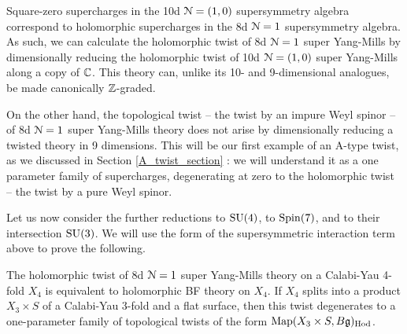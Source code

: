 \documentclass[10pt, oneside]{article}
\begin{document}
Square-zero supercharges in the 10d $\mathcal{N}=(1,0)$ supersymmetry algebra correspond to holomorphic supercharges in the 8d $\mathcal{N}=1$ supersymmetry algebra.  As such, we can calculate the holomorphic twist of 8d $\mathcal{N}=1$ super Yang-Mills by dimensionally reducing the holomorphic twist of 10d $\mathcal{N}=(1,0)$ super Yang-Mills along a copy of $\mathbb C$.  This theory can, unlike its 10- and 9-dimensional analogues, be made canonically $\mathbb Z$-graded.

On the other hand, the topological twist -- the twist by an impure Weyl spinor -- of 8d $\mathcal{N}=1$ super Yang-Mills theory does not arise by dimensionally reducing a twisted theory in 9 dimensions.  This will be our first example of an A-type twist, as we discussed in Section \ref{A_twist_section} : we will understand it as a one parameter family of supercharges, degenerating at zero to the holomorphic twist -- the twist by a pure Weyl spinor.

Let us now consider the further reductions to $\mathrm{SU}(4)$, to $\mathrm{Spin}(7)$, and to their intersection $\mathrm{SU}(3)$.  We will use the form of the supersymmetric interaction term above to prove the following.

\begin{theorem} \label{8d_holo_twist_thm}
The holomorphic twist of 8d $\mathcal{N}=1$ super Yang-Mills theory on a Calabi-Yau 4-fold $X_4$ is equivalent to holomorphic BF theory on $X_4$. If $X_4$ splits into a product $X_3 \times S$ of a Calabi-Yau 3-fold and a flat surface, then this twist degenerates to a one-parameter family of topological twists of the form $\operatorname{Map}(X_3 \times S, B\mathfrak{g})_{\mathrm{Hod}}$.
\end{theorem}
\end{document}
